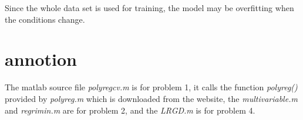 \documentclass[a4paper,12pt]{article}
\begin{document}
\begin{figure}[h]
\setcounter{subfigure}{16}
\centering
{}
\end{figure}

Since the whole data set is used for training, the model may be overfitting when the conditions change.

\section{annotion}

The matlab source file \textit{polyregcv.m} is for problem 1, it calls the function \textsl{polyreg()} provided by \textit{polyreg.m} which is downloaded from the website, the \textit{multivariable.m} and \textit{regrimin.m} are for problem 2, and the \textit{LRGD.m} is for problem 4.
\end{document}
